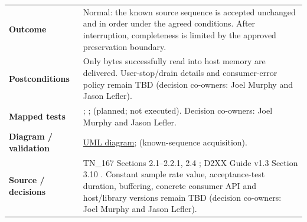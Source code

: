 \begin{tabularx}{\linewidth}{L{3.5cm}Y}
\textbf{Outcome} & Normal: the known source sequence is accepted unchanged and in order under the agreed conditions. After interruption, completeness is limited by the approved preservation boundary.\\
\textbf{Postconditions} & Only bytes successfully read into host memory are delivered. User-stop/drain details and consumer-error policy remain TBD (decision co-owners: Joel Murphy and Jason Lefler).\\
\textbf{Mapped tests} & ; ;  (planned; not executed). Decision co-owners: Joel Murphy and Jason Lefler.\\
\textbf{Diagram / validation} & \hyperref[Figure:UseCaseDiagram]{UML diagram};  (known-sequence acquisition).\\
\textbf{Source / decisions} & TN\_167 Sections 2.1--2.2.1, 2.4 \cite{FTDI_TN167_v1_0}; D2XX Guide v1.3 Section 3.10 \cite{FTDI_D2XX_v1_3}. Constant sample rate value, acceptance-test duration, buffering, concrete consumer API and host/library versions remain TBD (decision co-owners: Joel Murphy and Jason Lefler).\\
\bottomrule
\end{tabularx}

